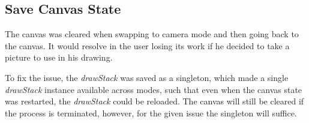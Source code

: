 \subsection{Save Canvas State}
The canvas was cleared when swapping to camera mode and then going back to the canvas.
It would resolve in the user losing its work if he decided to take a picture to use in his drawing.

To fix the issue, the \textit{drawStack} was saved as a singleton, which made a single \textit{drawStack} instance available across modes, such that even when the canvas state was restarted, the \textit{drawStack} could be reloaded. 
The canvas will still be cleared if the process is terminated, however, for the given issue the singleton will suffice.